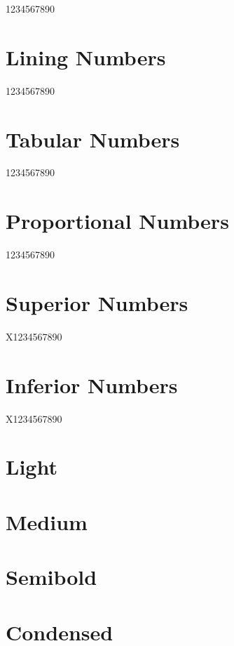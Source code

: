 \documentclass{article}
\begin{document}
{1234567890}

\section*{Lining Numbers}

{1234567890}

\section*{Tabular Numbers}

{1234567890}

\section*{Proportional Numbers}

{1234567890}


\section*{Superior Numbers}

X{1234567890}

\section*{Inferior Numbers}

X{1234567890}

\section*{Light}

{\jLight\lipsum[1]}

\section*{Medium}

{\jMedium\lipsum[2]}

\section*{Semibold}

{\jSmbold\lipsum[3]}

\section*{Condensed}
\end{document}

